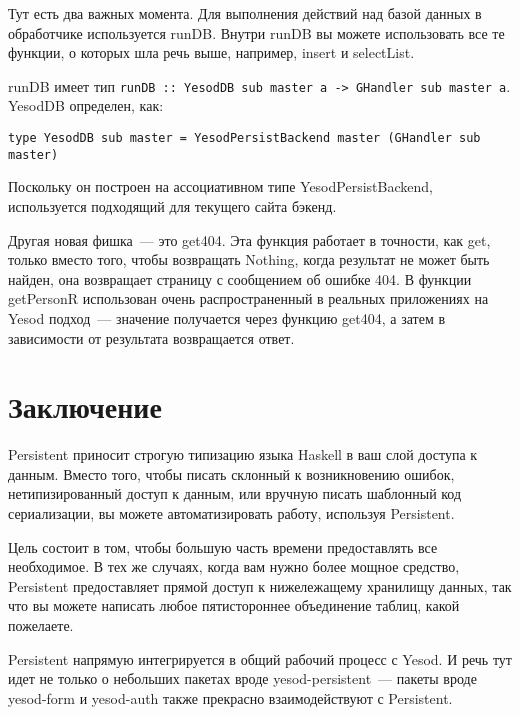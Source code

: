 Тут есть два важных момента. Для выполнения действий над базой данных в обработчике используется runDB. Внутри runDB вы можете использовать все те функции, о которых шла речь выше, например, insert и selectList. 

\begin{remark}
runDB имеет тип \lstinline'runDB :: YesodDB sub master a -> GHandler sub master a'. YesodDB определен, как:

\begin{lstlisting}
type YesodDB sub master = YesodPersistBackend master (GHandler sub master)
\end{lstlisting}

Поскольку он построен на ассоциативном типе YesodPersistBackend, используется подходящий для текущего сайта бэкенд.
\end{remark}

Другая новая фишка~--- это get404. Эта функция работает в точности, как get, только вместо того, чтобы возвращать Nothing, когда результат не может быть найден, она возвращает страницу с сообщением об ошибке 404. В функции getPersonR использован очень распространенный в реальных приложениях на Yesod подход~--- значение получается через функцию get404, а затем в зависимости от результата возвращается ответ.

\section{Заключение} %

Persistent приносит строгую типизацию языка Haskell в ваш слой доступа к данным. Вместо того, чтобы писать склонный к возникновению ошибок, нетипизированный доступ к данным, или вручную писать шаблонный код сериализации, вы можете автоматизировать работу, используя Persistent.

Цель состоит в том, чтобы большую часть времени предоставлять все необходимое. В тех же случаях, когда вам нужно более мощное средство, Persistent предоставляет прямой доступ к нижележащему хранилищу данных, так что вы можете написать любое пятистороннее объединение таблиц, какой пожелаете.

Persistent напрямую интегрируется в общий рабочий процесс с Yesod. И речь тут идет не только о небольших пакетах вроде yesod-persistent~--- пакеты вроде yesod-form и yesod-auth также прекрасно взаимодействуют с Persistent.  %
